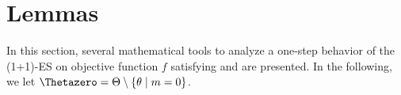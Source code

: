 \documentclass[journal]{IEEEtran}
\providecommand{\R}{\mathbb{R}} %
\renewcommand{\geq}{\geqslant} %
\renewcommand{\leq}{\leqslant} %
\DeclarePairedDelimiter{\norm}{\lVert}{\rVert}
\newtheorem{proposition}[theorem]{Proposition}
\theoremstyle{definition}
\begin{document}
%     

\section{Lemmas}


In this section, several mathematical tools to analyze a one-step behavior of the (1+1)-ES on objective function $f$ satisfying  and  are presented. 
In the following, we let $\Thetazero = \Theta \setminus \{\theta \mid m = 0\}$. 
\end{document}
